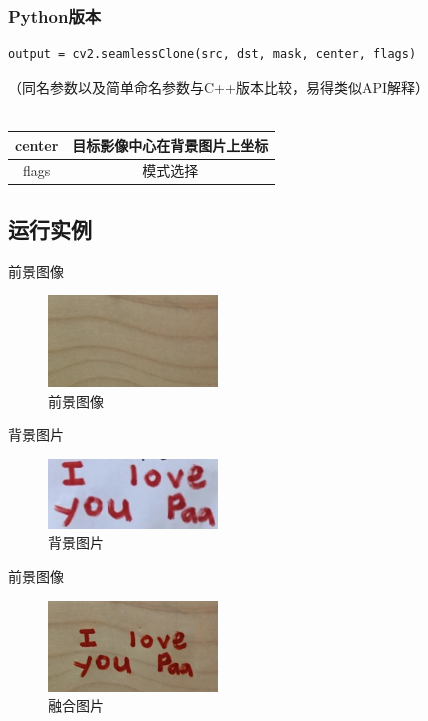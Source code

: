 \documentclass{article}
\begin{document}
\subsubsection{Python版本}
\begin{lstlisting}
output = cv2.seamlessClone(src, dst, mask, center, flags)
\end{lstlisting}

（同名参数以及简单命名参数与C++版本比较，易得类似API解释）\\ \\
\begin{tabular}{cc}
	\hline
	center& 目标影像中心在背景图片上坐标\\
	\hline
	flags& 模式选择\\
	\hline
	\end{tabular}


    \subsection{运行实例}
    前景图像
    \begin{figure}[H]
        \centering
        \includegraphics[width=0.4\textwidth]{img/back.png} 
        \caption{前景图像}
        \label{fig.5}
    \end{figure}
  背景图片
\begin{figure}[H]
	\centering
	\includegraphics[width=0.4\textwidth]{img/front.png} 
	\caption{背景图片}
	\label{fig.6}
\end{figure}   
  前景图像
\begin{figure}[H]
	\centering
	\includegraphics[width=0.4\textwidth]{img/result.png} 
	\caption{融合图片}
	\label{fig.7}
\end{figure}
\end{document}
